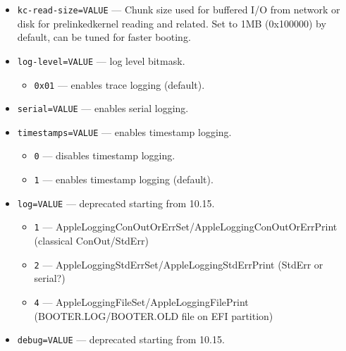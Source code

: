 \documentclass[]{article}
\providecommand{\DIFaddtex}[1]{{\protect\color{blue}\uwave{#1}}} %
\providecommand{\DIFdeltex}[1]{{\protect\color{red}\sout{#1}}}                      %
\providecommand{\DIFaddbegin}{\global\booltrue{DIFkeeppage}\global\booltrue{DIFchange}} %
\providecommand{\DIFaddend}{\global\booltrue{DIFkeeppage}\global\boolfalse{DIFchange}} %
\providecommand{\DIFdelbegin}{\global\booltrue{DIFkeeppage}\global\booltrue{DIFchange}} %
\providecommand{\DIFdelend}{\global\booltrue{DIFkeeppage}\global\boolfalse{DIFchange}} %
\providecommand{\DIFadd}[1]{\texorpdfstring{\DIFaddtex{#1}}{#1}} %
\providecommand{\DIFdel}[1]{\texorpdfstring{\DIFdeltex{#1}}{}} %
\begin{document}
\begin{itemize}
\begin{itemize}
\begin{itemize}
    \end{itemize}
  \item \texttt{kc-read-size=VALUE} --- Chunk size used for buffered I/O from network or
    disk for prelinkedkernel reading and related. Set to 1MB (0x100000) by default, can be
    tuned for faster booting.
  \item \texttt{log-level=VALUE} --- log level bitmask.
    \begin{itemize}
    \item \texttt{0x01} --- enables trace logging (default).
    \end{itemize}
  \item \texttt{serial=VALUE} --- enables serial logging.
  \item \texttt{timestamps=VALUE} --- enables timestamp logging.
    \begin{itemize}
    \item \texttt{0} --- disables timestamp logging.
    \item \texttt{1} --- enables timestamp logging (default).
    \end{itemize}
  \item \texttt{log=VALUE} --- deprecated starting from 10.15.
    \begin{itemize}
    \item \texttt{1} --- AppleLoggingConOutOrErrSet/AppleLoggingConOutOrErrPrint
    (classical ConOut/StdErr)
    \item \texttt{2} --- AppleLoggingStdErrSet/AppleLoggingStdErrPrint (StdErr or serial?)
    \item \texttt{4} --- AppleLoggingFileSet/AppleLoggingFilePrint (BOOTER.LOG/BOOTER.OLD
    file on EFI partition)
    \end{itemize}
  \item \texttt{debug=VALUE} --- deprecated starting from 10.15.

\end{itemize}
\end{itemize}
\end{document}
